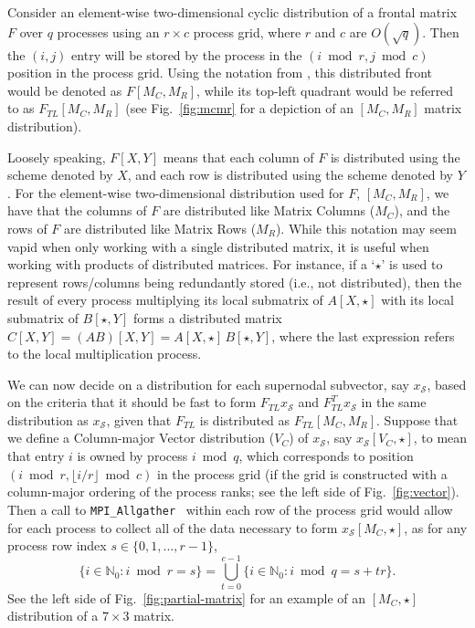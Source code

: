 Consider an element-wise two-dimensional cyclic distribution 
\cite{Poulson-elemental} of a frontal matrix $F$ over $q$ processes using an 
$r \times c$ process grid, where $r$ and $c$ are $O(\sqrt{q})$. Then the 
$(i,j)$ entry will be stored by the process in the $(i \bmod r,j \bmod c)$ 
position in the process grid. 
Using the notation from \cite{Poulson-elemental}, this distributed front would 
be denoted as $F[M_C,M_R]$, while its top-left quadrant would be referred to 
as $F_{TL}[M_C,M_R]$ (see Fig.~\ref{fig:mcmr} for a depiction of an $[M_C,M_R]$ matrix distribution). 



Loosely speaking, $F[X,Y]$ means that each column
of $F$ is distributed using the scheme denoted by $X$, and each row
is distributed using the scheme denoted by $Y$. For the element-wise 
two-dimensional distribution used for $F$, $[M_C,M_R]$, we have that the 
columns of $F$ are distributed like Matrix Columns ($M_C$), and the rows 
of $F$ are distributed like Matrix Rows ($M_R$). While this notation may seem
vapid when only working with a single distributed matrix, it is useful when
working with products of distributed matrices. For instance, if a `$\star$' is 
used to represent rows/columns being redundantly stored (i.e., not distributed),
then the result of every process multiplying its local submatrix of 
$A[X,\star]$ with its local submatrix of $B[\star,Y]$ forms a distributed
matrix $C[X,Y] = (AB)[X,Y] = A[X,\star]\, B[\star,Y]$, where the last 
expression refers to the local multiplication process.

We can now decide on a distribution for each supernodal subvector, say 
$x_{\mathcal{S}}$, based on the criteria that it should be fast to 
form $F_{TL} x_{\mathcal{S}}$ and $F_{TL}^T x_{\mathcal{S}}$ in the same 
distribution as $x_{\mathcal{S}}$, given that $F_{TL}$ is distributed as 
$F_{TL}[M_C,M_R]$. Suppose that we define a Column-major Vector distribution 
($V_C$) of $x_{\mathcal{S}}$, say $x_{\mathcal{S}}[V_C,\star]$, to 
mean that entry $i$ is owned by process $i \bmod q$, which corresponds 
to position $(i \bmod r,\lfloor i/r \rfloor \bmod c)$ in the process grid 
(if the grid is constructed with a column-major ordering of the process ranks; 
 see the left side of Fig.~\ref{fig:vector}).
Then a call to \verb!MPI_Allgather!~\cite{Dongarra-mpi} within each row of the 
process grid would allow for each process to collect all of the data necessary 
to form $x_{\mathcal{S}}[M_C,\star]$, as for any process row index 
$s \in \{0,1,...,r-1\}$,
\begin{equation}\label{vc-to-mc}
  \{ i \in \mathbb{N}_0 : i \bmod r = s \} = 
  \bigcup_{t=0}^{c-1} \{ i \in \mathbb{N}_0 : i \bmod q = s+tr \}.
\end{equation}
See the left side of Fig.~\ref{fig:partial-matrix} for an example of an 
$[M_C,\star]$ distribution of a $7 \times 3$ matrix.

